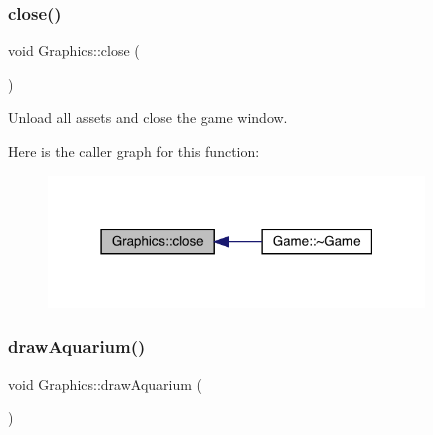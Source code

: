 \mbox{\label{class_graphics_a5285ec6ed237f24f7d7cf2423886a0cc}} 
\subsubsection{\texorpdfstring{close()}{close()}}
{\footnotesize\ttfamily void Graphics\+::close (\begin{DoxyParamCaption}{ }\end{DoxyParamCaption})}



Unload all assets and close the game window. 

Here is the caller graph for this function\+:\nopagebreak
\begin{figure}[H]
\begin{center}
\leavevmode
\includegraphics[width=283pt]{class_graphics_a5285ec6ed237f24f7d7cf2423886a0cc_icgraph}
\end{center}
\end{figure}
\mbox{\label{class_graphics_a5f3a657a7c54f13108bd90e6a85bd02e}} 
\subsubsection{\texorpdfstring{draw\+Aquarium()}{drawAquarium()}}
{\footnotesize\ttfamily void Graphics\+::draw\+Aquarium (\begin{DoxyParamCaption}{ }\end{DoxyParamCaption})}


